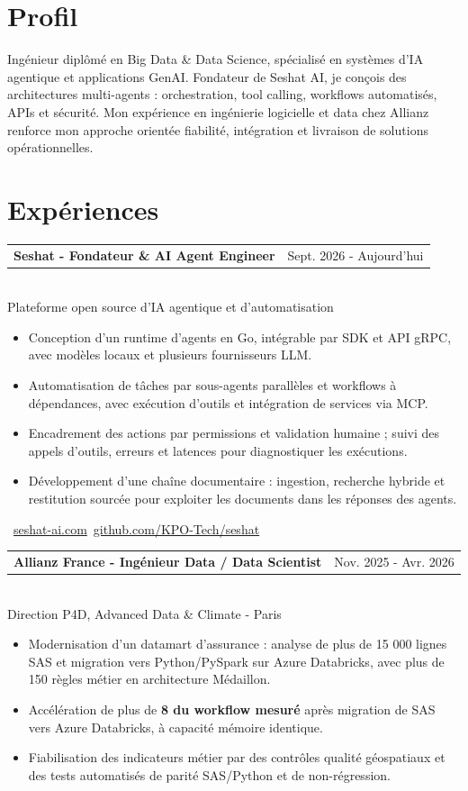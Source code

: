 \documentclass[10pt,a4paper]{article}
\makeatletter
\newcommand{\role}[3]{%
  \vspace{3pt}
  \begin{tabularx}{\linewidth}{@{}Xr@{}}
  \textbf{#1} & {\color{muted}#2}
  \end{tabularx}\vspace{0.8pt}\\
  {\color{muted}#3}\par
  \vspace{3pt}
}
\makeatother
\begin{document}
\begin{lrbox}{\maincolumnbox}
\begin{minipage}[t]{0.695\textwidth}
\vspace{0pt}
\raggedright

\section{Profil}
Ingénieur diplômé en Big Data \& Data Science, spécialisé en systèmes d'IA agentique et applications GenAI. Fondateur de Seshat AI, je conçois des architectures multi-agents : orchestration, tool calling, workflows automatisés, APIs et sécurité. Mon expérience en ingénierie logicielle et data chez Allianz renforce mon approche orientée fiabilité, intégration et livraison de solutions opérationnelles.

\section{Expériences}
\role{Seshat - Fondateur \& AI Agent Engineer}{Sept. 2026 - Aujourd'hui}{Plateforme open source d'IA agentique et d'automatisation}
\begin{itemize}
  \item Conception d'un runtime d'agents en Go, intégrable par SDK et API gRPC, avec modèles locaux et plusieurs fournisseurs LLM.
  \item Automatisation de tâches par sous-agents parallèles et workflows à dépendances, avec exécution d'outils et intégration de services via MCP.
  \item Encadrement des actions par permissions et validation humaine ; suivi des appels d'outils, erreurs et latences pour diagnostiquer les exécutions.
  \item Développement d'une chaîne documentaire : ingestion, recherche hybride et restitution sourcée pour exploiter les documents dans les réponses des agents.
\end{itemize}
{\footnotesize\color{accent}\ \href{https://seshat-ai.com}{seshat-ai.com}\enspace\textbullet\enspace{}\ \href{https://github.com/KPO-Tech/seshat}{github.com/KPO-Tech/seshat}}\par

\vspace{8pt}
\role{Allianz France - Ingénieur Data / Data Scientist}{Nov. 2025 - Avr. 2026}{Direction P4D, Advanced Data \& Climate - Paris}
\begin{itemize}
  \item Modernisation d'un datamart d'assurance : analyse de plus de 15 000 lignes SAS et migration vers Python/PySpark sur Azure Databricks, avec plus de 150 règles métier en architecture Médaillon.
  \item Accélération de plus de \textbf{8\texttimes{} du workflow mesuré} après migration de SAS vers Azure Databricks, à capacité mémoire identique.
  \item Fiabilisation des indicateurs métier par des contrôles qualité géospatiaux et des tests automatisés de parité SAS/Python et de non-régression.
\end{itemize}


\end{minipage}
\end{lrbox}
\end{document}
